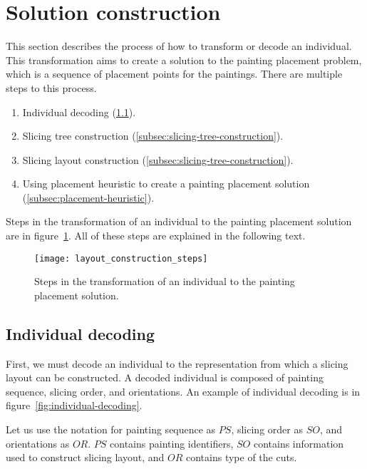 \newpage
\section{Solution construction}\label{sec:solution-construction}

This section describes the process of how to transform or decode an individual.
This transformation aims to create a solution to the painting placement problem,
which is a sequence of placement points for the paintings.
There are multiple steps to this process.

\begin{enumerate}
    \item Individual decoding (\ref{subsec:individual-decoding}).
    \item Slicing tree construction (\ref{subsec:slicing-tree-construction}).
    \item Slicing layout construction (\ref{subsec:slicing-tree-construction}).
    \item Using placement heuristic to create a painting placement solution (\ref{subsec:placement-heuristic}).
\end{enumerate}

Steps in the transformation of an individual to the painting placement solution are
in figure~\ref{fig:layout-construction-steps}.
All of these steps are explained in the following text.


\begin{figure}[h!]
    \texttt{[image: layout\_construction\_steps]}
    \caption[Transformation of an individual to the painting placement solution]
    {Steps in the transformation of an individual to the painting placement solution.}
    \label{fig:layout-construction-steps}
\end{figure}

\subsection{Individual decoding}\label{subsec:individual-decoding}
First, we must decode an individual to the representation from which a slicing layout can be constructed.
A decoded individual is composed of painting sequence, slicing order, and orientations.
An example of individual decoding is in figure~\ref{fig:individual-decoding}.

Let us use the notation for painting sequence as $PS$, slicing order as $SO$, and orientations as $OR$.
$PS$ contains painting identifiers, $SO$ contains information used to construct slicing layout,
and $OR$ contains type of the cuts.\\


